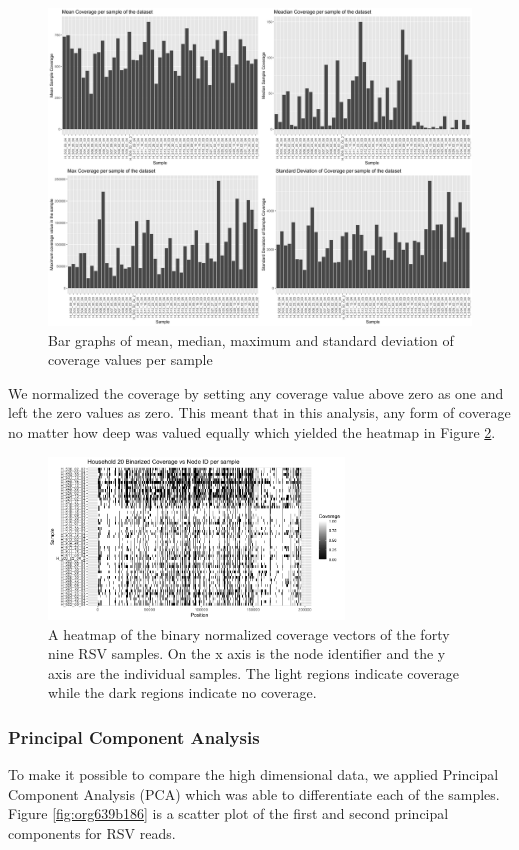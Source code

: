 \documentclass[10pt, a4paper]{article}
\begin{document}
\begin{figure}[h]
\centering
\includegraphics[width=.9\linewidth]{../Figures/RSV/structure_of_coverage_data.png}
\caption[RSV Structure of the Data]{\label{fig:org249ad5e}
Bar graphs of mean, median, maximum and standard deviation of coverage values per sample}
\end{figure}


We normalized the coverage by setting any coverage value above zero as one and 
left the zero values as zero. This meant that in this analysis, any form of
coverage no matter how deep was valued equally which yielded the heatmap in
Figure \ref{fig:org1df6323}.

\begin{figure}[h!]
\centering
\includegraphics[width=0.7\textwidth]{../Figures/RSV/Heatmap.png}
\caption[RSV heatmap]{\label{fig:org1df6323}
A heatmap of the binary normalized coverage vectors of the forty nine RSV samples. On the x axis is the node identifier and the y axis are the individual samples. The light regions indicate coverage while the dark regions indicate no coverage.}
\end{figure}

\newpage
\subsubsection{Principal Component Analysis}
\label{sec:org7ef825e}
To make it possible to compare the high dimensional data, we applied Principal 
Component Analysis (PCA) which was able to differentiate each of the samples.
Figure \ref{fig:org639b186} is a scatter plot of the first and second principal 
components for RSV reads.
\end{document}
